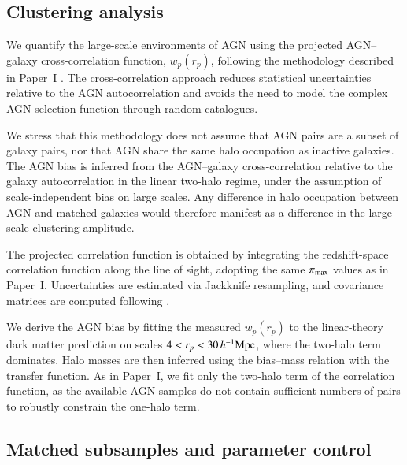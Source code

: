 \documentclass{aa}
\begin{document}
\subsection{Clustering analysis}
\label{sec_clustering}

We quantify the large-scale environments of AGN using the projected AGN--galaxy cross-correlation function, $w_p(r_p)$, following the methodology described in Paper~I \citep[see also][]{Mountrichas2009a, Mountrichas2012, Mountrichas2013, Mountrichas2016}. The cross-correlation approach reduces statistical uncertainties relative to the AGN autocorrelation and avoids the need to model the complex AGN selection function through random catalogues.

We stress that this methodology does not assume that AGN pairs are a subset of galaxy pairs, nor that AGN share the same halo occupation as inactive galaxies. The AGN bias is inferred from the AGN--galaxy cross-correlation relative to the galaxy autocorrelation in the linear two-halo regime, under the assumption of scale-independent bias on large scales. Any difference in halo occupation between AGN and matched galaxies would therefore manifest as a difference in the large-scale clustering amplitude.

The projected correlation function is obtained by integrating the redshift-space correlation function along the line of sight, adopting the same $\pi_{\rm max}$ values as in Paper~I. Uncertainties are estimated via Jackknife resampling, and covariance matrices are computed following \citet{Ross2008}.

We derive the AGN bias by fitting the measured $w_p(r_p)$ to the linear-theory dark matter prediction on scales $4<r_p<30\,h^{-1}{\rm Mpc}$, where the two-halo term dominates. Halo masses are then inferred using the \citet{Sheth2001} bias--mass relation with the \citet{Eisenstein1998} transfer function. As in Paper~I, we fit only the two-halo term of the correlation function, as the available AGN samples do not contain sufficient numbers of pairs to robustly constrain the one-halo term.

\subsection{Matched subsamples and parameter control}
\label{sec_matching}
\end{document}
